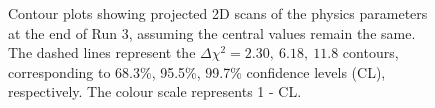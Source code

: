 \begin{figure}[h]
\centering
{}
\caption{Contour plots showing projected 2D scans of the physics parameters at the end of Run 3, assuming the central values remain the same. The dashed lines represent the $\Delta \chi^2 = 2.30,\ 6.18,\ 11.8$ contours, corresponding to 68.3\%, 95.5\%, 99.7\% confidence levels (CL), respectively. The colour scale represents 1 - CL.}
\label{gammadiniplotsrun3}
\end{figure}

